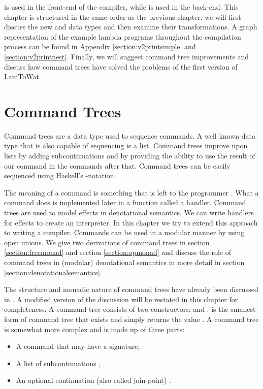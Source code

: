  is used in the front-end of the compiler, while  is used in the back-end. This chapter is structured in the same order as the previous chapter: we will first discuss the new  and  data types and then examine their transformations. A graph representation of the example lambda programs throughout the compilation process can be found in Appendix \ref{section:v2printsimple} and \ref{section:v2printnest}. Finally, we will suggest command tree improvements and discuss how command trees have solved the problems of the first version of LamToWat.

\section{\label{section:commandtree}Command Trees}
Command trees are a data type used to sequence commands. A well known data type that is also capable of sequencing is a list. Command trees improve upon lists by adding subcontinuations and by providing the ability to use the result of our command in the commands after that. Command trees can be easily sequenced using Haskell's -notation.

The meaning of a command is something that is left to the programmer \autocite{DBLP:journals/corr/PlotkinP13, DBLP:conf/haskell/WuSH14}. What a command does is implemented later in a function called a handler. Command trees are used to model effects in denotational semantics. We can write handlers for effects to create an interpreter. In this chapter we try to extend this approach to writing a compiler. Commands can be used in a modular manner by using open unions. We give two derivations of command trees in section \ref{section:freemonad} and section \ref{section:opmonad} and discuss the role of command trees in (modular) denotational semantics in more detail in section \ref{section:denotationalsemantics}.

The structure and monadic nature of command trees have already been discussed in  \autocite{commandtreespoulsen}. A modified version of the discussion will be restated in this chapter for completeness. A command tree consists of two constructors:  and .  is the smallest form of command tree that exists and simply returns the value . A  command tree is somewhat more complex and is made up of three parts:

\begin{itemize}
\item A command  that may have a signature,
\item A list of subcontinuations ,
\item An optional continuation (also called join-point) .
\end{itemize}

